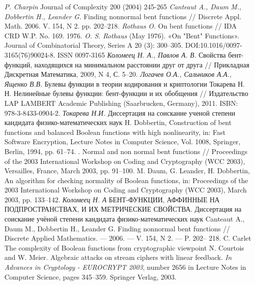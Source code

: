 \begin{thebibliography}{99}
 {\it P. Charpin} Journal of Complexity 200 (2004) 245-265
 {\it Canteaut A., Daum M., Dobbertin H., Leander G.} Finding nonnormal bent functions // Discrete Appl. Math. 2006. V. 154, N 2. pp. 202–218.
 {\it Rothaus O.} On bent functions // IDA CRD W.P. No. 169. 1976.
  {\it O. S. Rothaus} (May 1976). «On "Bent" Functions». Journal of Combinatorial Theory, Series A 20 (3): 300–305. DOI:10.1016/0097-3165(76)90024-8. ISSN 0097-3165
 {\it Коломеец Н. А., Павлов А. В.} Свойства бент-функций, находящихся
на минимальном расстоянии друг от друга // Прикладная Дискретная
Математика, 2009, N 4, С. 5–20.
 {\it Логачев О.А., Сальников А.А., Ященко В.В.} Булевы функции в теории кодирования и криптологии
Токарева Н. Н. Нелинейные булевы функции: бент-функции и их обобщения // Издательство LAP
LAMBERT Academic Publishing (Saarbrucken, Germany), 2011. ISBN: 978-3-8433-0904-2.
 {\it Токарева Н.И.} Диссертация на соискание ученой степени
кандидата физико-математических наук
 H. Dobbertin, Construction of bent functions and balanced Boolean functions with high
nonlinearity, in: Fast Software Encryption, Lecture Notes in Computer Science, Vol. 1008, Springer,
Berlin, 1994, pp. 61–74.
. Normal and non normal bent functions // Proceedings of the 2003 International Workshop on Coding and Cryptography (WCC 2003), Versailles, France, March 2003, pp. 91–100.
 M. Daum, G. Leander, H. Dobbertin, An algorithm for checking normality of Boolean functions, in:
Proceedings of the 2003 International Workshop on Coding and Cryptography (WCC 2003), March
2003, pp. 133–142.
 {\it Коломеец Н. А} БЕНТ-ФУНКЦИИ, АФФИННЫЕ НА ПОДПРОСТРАНСТВАХ, И ИХ
МЕТРИЧЕСКИЕ СВОЙСТВА. Диссертация на соискание учёной степени
кандидата физико-математических наук
 Canteaut A., Daum M., Dobbertin H., Leander G. Finding nonnormal bent
functions // Discrete Applied Mathematics. — 2006. — V. 154, N 2. — P. 202–
218.
 C. Carlet The complexity of Boolean functions from cryptographic viewpoint
N. Courtois and W. Meier. Algebraic attacks on stream ciphers with linear feedback. {\it In Advances in Cryptology - EUROCRYPT 2003}, number 2656 in Lecture Notes in Computer Science, pages 345–359. Springer Verlag,  2003.

\end{thebibliography}
